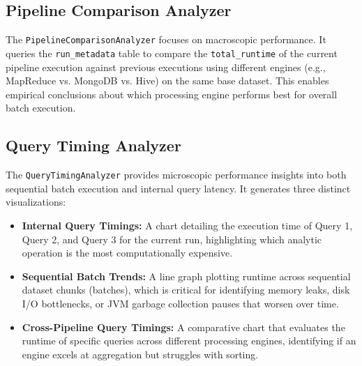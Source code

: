 \documentclass[11pt,a4paper]{article}
\begin{document}
\subsection{Pipeline Comparison Analyzer}
The \texttt{PipelineComparisonAnalyzer} focuses on macroscopic performance. It queries the \texttt{run\_metadata} table to compare the \texttt{total\_runtime} of the current pipeline execution against previous executions using different engines (e.g., MapReduce vs. MongoDB vs. Hive) on the same base dataset. This enables empirical conclusions about which processing engine performs best for overall batch execution.

\vspace{5cm} %

\subsection{Query Timing Analyzer}
The \texttt{QueryTimingAnalyzer} provides microscopic performance insights into both sequential batch execution and internal query latency. It generates three distinct visualizations:
\begin{itemize}
    \item \textbf{Internal Query Timings:} A chart detailing the execution time of Query 1, Query 2, and Query 3 for the current run, highlighting which analytic operation is the most computationally expensive.
    \item \textbf{Sequential Batch Trends:} A line graph plotting runtime across sequential dataset chunks (batches), which is critical for identifying memory leaks, disk I/O bottlenecks, or JVM garbage collection pauses that worsen over time.
    \item \textbf{Cross-Pipeline Query Timings:} A comparative chart that evaluates the runtime of specific queries across different processing engines, identifying if an engine excels at aggregation but struggles with sorting.
\end{itemize}

\vspace{5cm} %
\end{document}
